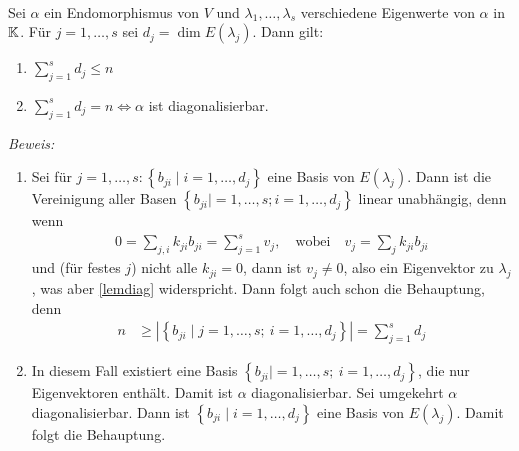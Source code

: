 \begin{mysatz}\ \\
    Sei $\alpha$ ein Endomorphismus von $V$ und $\lambda_1,\ldots,\lambda_s$ verschiedene Eigenwerte von $\alpha$ in $\mathbb{K}$. Für $j=1,\ldots,s$ sei $d_j=\dim E(\lambda_j)$. Dann gilt:
    \begin{enumerate}
        \item $\sum\limits_{j=1}^s d_j \leq n$
        \item $\sum\limits_{j=1}^s d_j = n \Leftrightarrow \alpha$ ist diagonalisierbar.
    \end{enumerate}

    \textit{Beweis:}
    \begin{enumerate}
        \item Sei für $j=1,\ldots,s: \left\{ b_{ji} \mid i=1,\ldots,d_j \right\}$ eine Basis von $E(\lambda_j)$. Dann ist die Vereinigung aller Basen $\left\{ b_{ji}|=1,\ldots,s; i=1,\ldots,d_j \right\}$ linear unabhängig, denn wenn
            \begin{align*}
                0 = \sum_{j,i} k_{ji}b_{ji} = \sum_{j=1}^s v_j, \quad \mbox{wobei} \quad v_j = \sum_j k_{ji} b_{ji}
            \end{align*}
            und (für festes $j$) nicht alle $k_{ji}=0$, dann ist $v_j \neq 0$, also ein Eigenvektor zu $\lambda_j$, was aber \ref{lemdiag} widerspricht. Dann folgt auch schon die Behauptung, denn
            \begin{align*}
                n & \geq \left|\left\{ b_{ji} \mid j = 1,\ldots,s;\ i=1,\ldots,d_j \right\} \right| = \sum_{j=1}^s d_j
            \end{align*}
        \item In diesem Fall existiert eine Basis $\left\{ b_{ji} \mid =1,\ldots,s;\ i=1,\ldots,d_j \right\}$, die nur Eigenvektoren enthält. Damit ist $\alpha$ diagonalisierbar. Sei umgekehrt $\alpha$ diagonalisierbar. Dann ist $\left\{ b_{ji} \mid i=1,\ldots,d_j \right\}$ eine Basis von $E(\lambda_j)$. Damit folgt die Behauptung.
    \end{enumerate}
\end{mysatz}



